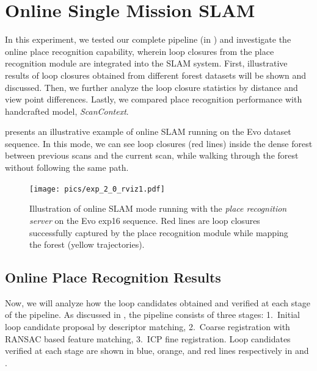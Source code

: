 \section{Online Single Mission SLAM}
\label{sec:exp_online_slam}
In this experiment, we tested our complete pipeline (in ) and investigate the online place recognition capability, wherein loop closures from the place recognition module are integrated into the SLAM system. First, illustrative results of loop closures obtained from different forest datasets will be shown and discussed. Then, we further analyze the loop closure statistics by distance and view point differences. Lastly, we compared place recognition performance with handcrafted model, \emph{ScanContext}. 

 presents an illustrative example of online SLAM running on the Evo dataset sequence. In this mode, we can see loop closures (red lines) inside the dense forest between previous scans and the current scan, while walking through the forest without following the same path. 
\begin{figure}[htbp]
  \centering
  \texttt{[image: pics/exp\_2\_0\_rviz1.pdf]}
  \caption{Illustration of online SLAM mode running with the \emph{place recognition server} on the Evo exp16 sequence. Red lines are loop closures successfully captured by the place recognition module while mapping the forest (yellow trajectories).}
  \label{fig:exp_2_0_rviz}
\end{figure}



\subsection*{Online Place Recognition Results}
Now, we will analyze how the loop candidates obtained and verified at each stage of the pipeline. As discussed in , the pipeline consists of three stages: 1.~Initial loop candidate proposal by descriptor matching, 2.~Coarse registration with RANSAC based feature matching, 3.~ICP fine registration. Loop candidates verified at each stage are shown in blue, orange, and red lines respectively in  and .

